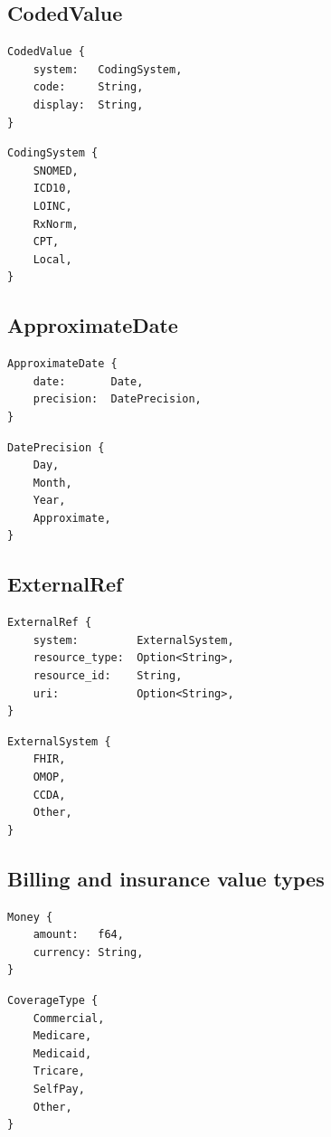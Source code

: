 \documentclass[11pt]{article}
\begin{document}
\subsection{CodedValue}

\begin{lstlisting}
CodedValue {
    system:   CodingSystem,
    code:     String,
    display:  String,
}
\end{lstlisting}

\begin{lstlisting}
CodingSystem {
    SNOMED,
    ICD10,
    LOINC,
    RxNorm,
    CPT,
    Local,
}
\end{lstlisting}

\subsection{ApproximateDate}

\begin{lstlisting}
ApproximateDate {
    date:       Date,
    precision:  DatePrecision,
}
\end{lstlisting}

\begin{lstlisting}
DatePrecision {
    Day,
    Month,
    Year,
    Approximate,
}
\end{lstlisting}

\subsection{ExternalRef}

\begin{lstlisting}
ExternalRef {
    system:         ExternalSystem,
    resource_type:  Option<String>,
    resource_id:    String,
    uri:            Option<String>,
}
\end{lstlisting}

\begin{lstlisting}
ExternalSystem {
    FHIR,
    OMOP,
    CCDA,
    Other,
}
\end{lstlisting}

\subsection{Billing and insurance value types}

\begin{lstlisting}
Money {
    amount:   f64,
    currency: String,
}
\end{lstlisting}

\begin{lstlisting}
CoverageType {
    Commercial,
    Medicare,
    Medicaid,
    Tricare,
    SelfPay,
    Other,
}
\end{lstlisting}
\end{document}
